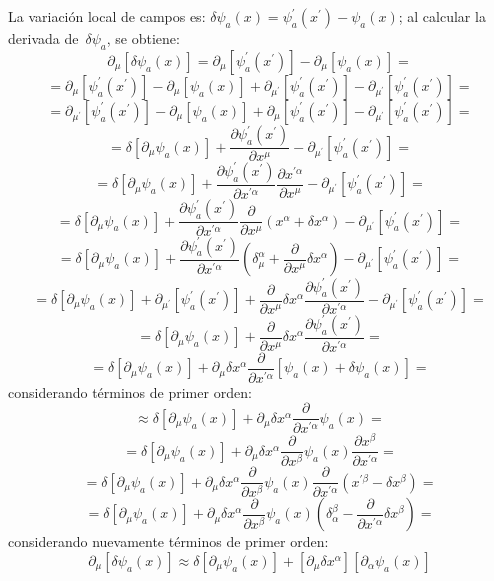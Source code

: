 \documentclass[a4paper,12pt]{article}
\begin{document}
La variación local de campos es: \mbox{$\delta\psi_a(x)=\psi_a^{'}(x^{'})-\psi_a(x)$}; al calcular la derivada \mbox{de $\delta\psi_a$,} se obtiene:
\begin{equation}
\partial_\mu[\delta\psi_a(x)]=\partial_\mu[\psi_a^{'}(x^{'})]-\partial_\mu[\psi_a(x)]=
\end{equation}
$$=\partial_\mu[\psi_a^{'}(x^{'})]-\partial_\mu[\psi_a(x)]+\partial_{\mu^{'}}[\psi_a^{'}(x^{'})]-\partial_{\mu^{'}}[\psi_a^{'}(x^{'})]=$$
$$=\partial_{\mu^{'}}[\psi_a^{'}(x^{'})]-\partial_\mu[\psi_a(x)]+\partial_\mu[\psi_a^{'}(x^{'})]-\partial_{\mu^{'}}[\psi_a^{'}(x^{'})]=$$
$$=\delta[\partial_\mu\psi_a(x)]+\frac{\partial \psi_a^{'}(x^{'})}{\partial x^\mu}-\partial_{\mu^{'}}[\psi_a^{'}(x^{'})]=$$
$$=\delta[\partial_\mu\psi_a(x)]+\frac{\partial \psi_a^{'}(x^{'})}{\partial x^{'\alpha}}\frac{\partial  x^{'\alpha}}{\partial x^\mu }-\partial_{\mu^{'}}[\psi_a^{'}(x^{'})]=$$
$$=\delta[\partial_\mu\psi_a(x)]+\frac{\partial \psi_a^{'}(x^{'})}{\partial x^{'\alpha}}\frac{\partial }{\partial x^\mu }(x^\alpha+\delta x^\alpha)-\partial_{\mu^{'}}[\psi_a^{'}(x^{'})]=$$
$$=\delta[\partial_\mu\psi_a(x)]+\frac{\partial \psi_a^{'}(x^{'})}{\partial x^{'\alpha}}(\delta^\alpha_\mu+\frac{\partial}{\partial x^\mu}\delta x^\alpha)-\partial_{\mu^{'}}[\psi_a^{'}(x^{'})]=$$
$$=\delta[\partial_\mu\psi_a(x)]+\partial_{\mu^{'}}[\psi_a^{'}(x^{'})]+\frac{\partial}{\partial x^\mu}\delta x^\alpha\frac{\partial \psi_a^{'}(x^{'})}{\partial x^{'\alpha}}-\partial_{\mu^{'}}[\psi_a^{'}(x^{'})]=$$
$$=\delta[\partial_\mu\psi_a(x)]+\frac{\partial}{\partial x^\mu}\delta x^\alpha\frac{\partial \psi_a^{'}(x^{'})}{\partial x^{'\alpha}}=$$
$$=\delta[\partial_\mu\psi_a(x)]+\partial_\mu\delta x^\alpha\frac{\partial }{\partial x^{'\alpha}}[\psi_a(x)+\delta\psi_a(x)]=$$
considerando términos de primer orden:
$$\approx\delta[\partial_\mu\psi_a(x)]+\partial_\mu\delta x^\alpha\frac{\partial }{\partial x^{'\alpha}}\psi_a(x)=$$
$$=\delta[\partial_\mu\psi_a(x)]+\partial_\mu\delta x^\alpha\frac{\partial }{\partial x^{\beta}}\psi_a(x)\frac{\partial x^{\beta}}{\partial x^{'\alpha}}=$$
$$=\delta[\partial_\mu\psi_a(x)]+\partial_\mu\delta x^\alpha\frac{\partial }{\partial x^{\beta}}\psi_a(x)\frac{\partial }{\partial x^{'\alpha}}(x^{'\beta}-\delta x^\beta)=$$
$$=\delta[\partial_\mu\psi_a(x)]+\partial_\mu\delta x^\alpha\frac{\partial }{\partial x^{\beta}}\psi_a(x)(\delta^{\beta}_\alpha-\frac{\partial }{\partial x^{'\alpha}}\delta x^\beta)=$$
considerando nuevamente términos de primer orden:
\begin{equation}
\partial_\mu[\delta\psi_a(x)]\approx \delta[\partial_\mu\psi_a(x)]+[\partial_\mu\delta x^\alpha][\partial_{\alpha}\psi_a(x)]
\end{equation}
\vspace{0,4cm}
\end{document}
